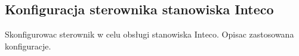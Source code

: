 \subsection{Konfiguracja sterownika stanowiska Inteco}
\label{lab:zad7}



\ifdefined\CompileFigures
%    
\fi

Skonfigurowac sterownik w celu obsługi stanowiska Inteco. Opisac zastosowana konfiguracje.

\newpage
